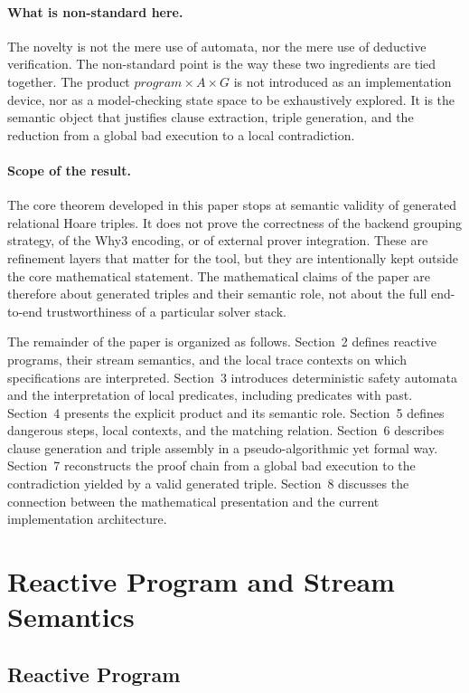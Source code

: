 \documentclass[11pt,a4paper]{article}
\begin{document}
\paragraph{What is non-standard here.}
The novelty is not the mere use of automata, nor the mere use of deductive
verification. The non-standard point is the way these two ingredients are tied
together. The product \(program \times A \times G\) is not introduced as an
implementation device, nor as a model-checking state space to be exhaustively
explored. It is the semantic object that justifies clause extraction, triple
generation, and the reduction from a global bad execution to a local
contradiction.

\paragraph{Scope of the result.}
The core theorem developed in this paper stops at semantic validity of
generated relational Hoare triples. It does not prove the correctness of the
backend grouping strategy, of the Why3 encoding, or of external prover
integration. These are refinement layers that matter for the tool, but they are
intentionally kept outside the core mathematical statement. The mathematical
claims of the paper are therefore about generated triples and their semantic
role, not about the full end-to-end trustworthiness of a particular solver
stack.

The remainder of the paper is organized as follows. Section~2 defines reactive
programs, their stream semantics, and the local trace contexts on which
specifications are interpreted. Section~3 introduces deterministic safety
automata and the interpretation of local predicates, including predicates with
past. Section~4 presents the explicit product and its semantic role. Section~5
defines dangerous steps, local contexts, and the matching relation. Section~6
describes clause generation and triple assembly in a pseudo-algorithmic yet
formal way. Section~7 reconstructs the proof chain from a global bad execution
to the contradiction yielded by a valid generated triple. Section~8 discusses
the connection between the mathematical presentation and the current
implementation architecture.

\section{Reactive Program and Stream Semantics}

\subsection{Reactive Program}
\end{document}
